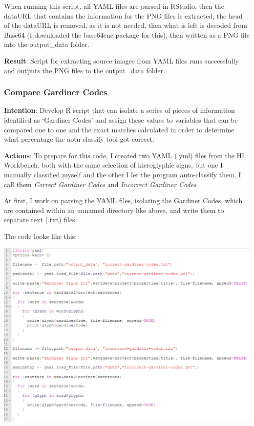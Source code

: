 \documentclass{article}
\begin{document}
When running this script, all YAML files are parsed in RStudio, then the dataURL that contains the information for the PNG files is extracted, the head of the dataURL is removed, as it is not needed, then what is left is decoded from Base64 (I downloaded the base64enc package for this), then written as a PNG file into the output\_data folder.

\textbf{Result}: Script for extracting source images from YAML files runs successfully and outputs the PNG files to the output\_data folder.

\subsubsection{Compare Gardiner Codes}

\textbf{Intention}: Develop R script that can isolate a series of pieces of information identified as `Gardiner Codes' and assign these values to variables that can be compared one to one and the exact matches calculated in order to determine what percentage the aotu-classify tool got correct.

\textbf{Actions}: To prepare for this code, I created two YAML (.yml) files from the HI Workbench, both with the same selection of hieroglyphic signs, but one I manually classified myself and the other I let the program auto-classify them. I call them \textit{Correct Gardiner Codes} and \textit{Incorrect Gardiner Codes}.

At first, I work on parsing the YAML files, isolating the Gardiner Codes, which are contained within an unnamed directory like above, and write them to separate text (.txt) files.

The code looks like this:

\includegraphics[width=1.0\textwidth]{rstudio_52.PNG}
\end{document}
